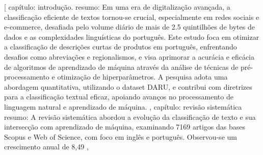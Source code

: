[
{
capítulo: introdução.
resumo: Em uma era de digitalização avançada, a classificação eficiente de textos tornou-se crucial, especialmente em redes sociais e e-commerce, desafiada pelo volume diário de mais de 2.5 quintilhões de bytes de dados e as complexidades linguísticas do português. Este estudo foca em otimizar a classificação de descrições curtas de produtos em português, enfrentando desafios como abreviações e regionalismos, e visa aprimorar a acurácia e eficácia de algoritmos de aprendizado de máquina através da análise de técnicas de pré-processamento e otimização de hiperparâmetros. A pesquisa adota uma abordagem quantitativa, utilizando o dataset DARU, e contribui com diretrizes para a classificação textual eficaz, apoiando avanços no processamento de linguagem natural e aprendizado de máquina.
},
{
capítulo: revisão sistemática
resumo: A revisão sistemática abordou a evolução da classificação de texto e sua intersecção com aprendizado de máquina, examinando 7169 artigos das bases Scopus e Web of Science, com foco em inglês e português. Observou-se um crescimento anual de 8,49%
},
